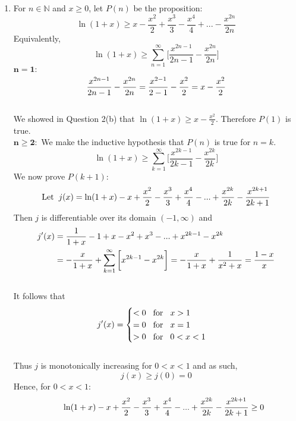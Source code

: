 \documentclass[12pt]{amsart}
\begin{document}
\begin{enumerate}
	\item For $n \in \mathbb{N}$ and $x\ge0$, let $P(n)$ be the proposition: 
		$$\ln(1+x) \ge x-\frac{x^2}{2}+\frac{x^3}{3}-\frac{x^4}{4}+...-\frac{x^{2n}}{2n}$$
		Equivalently,
		$$\ln(1+x) \ge \sum_{n=1}^\infty \Bigg[\frac{x^{2n-1}}{2n-1} - \frac{x^{2n}}{2n}\Bigg]$$
		$\mathbf{n=1:}$
			\begin{align}
				\frac{x^{2n-1}}{2n-1} - \frac{x^{2n}}{2n}= \frac{x^{2-1}}{2-1}-\frac{x^2}{2} = x - \frac{x^2}{2} 				\notag
			\end{align} \\
		We showed in Question 2(b) that $\ln(1+x) \ge x-\frac{x^2}{2}$. Therefore $P(1)$ is true. 
		\\
		$\mathbf{n \ge 2:}$ We make the inductive hypothesis that $P(n)$ is true for $n=k$.
		$$\ln(1+x) \ge \sum_{k=1}^\infty \Bigg[\frac{x^{2k-1}}{2k-1} - \frac{x^{2k}}{2k}\Bigg]$$
		We now prove $P(k+1):$ 
		$$\text{Let} \hspace{0.2cm} j(x)=\ln(1+x)-x+\frac{x^2}{2}-\frac{x^3}{3}+\frac{x^4}{4}-...
		+\frac{x^{2k}}{2k}-\frac{x^{2k+1}}{2k+1}$$
		Then $j$ is differentiable over its domain $(-1,\infty)$ and
			\begin{align}
				j'(x)&=\frac{1}{1+x}-1+x-x^2+x^3-...+x^{2k-1}-x^{2k} \notag \\
				& = -\frac{x}{1+x}+\sum_{k=1}^\infty \bigg[x^{2k-1}-x^{2k}\bigg] = -\frac{x}{1+x} +
				\frac{1}{x^2+x} = \frac{1-x}{x} \notag
			\end{align} \\
		It follows that 
			\begin{align}
				j'(x)= \notag
				\begin{cases}
					<0 \hspace{0.3cm} \text{for} \hspace{0.3cm} x>1 \notag \\
					=0 \hspace{0.3cm} \text{for} \hspace{0.3cm} x=1\notag \\
					>0 \hspace{0.3cm} \text{for} \hspace{0.3cm} 0<x<1 \notag 
				\end{cases}
			\end{align}
		\\		
		Thus $j$ is monotonically increasing for $0<x<1$ and as such,
		$$j(x) \ge j(0)=0$$
		Hence, for $0<x<1:$
		$$\text{ } \hspace{0.5cm} \ln(1+x)-x+\frac{x^2}{2}-\frac{x^3}{3}+\frac{x^4}{4}-...+\frac{x^{2k}}{2k}-
		\frac{x^{2k+1}}{2k+1} \ge 0$$ 
		

\end{enumerate}
\end{document}
